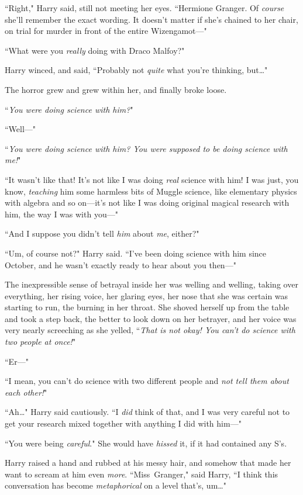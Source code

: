 ``Right," Harry said, still not meeting her eyes. ``Hermione Granger. Of \emph{course} she'll remember the exact wording. It doesn't matter if she's chained to her chair, on trial for murder in front of the entire Wizengamot—"

``What were you \emph{really} doing with Draco Malfoy?"

Harry winced, and said, ``Probably not \emph{quite} what you're thinking, but{\ldots}"

The horror grew and grew within her, and finally broke loose.

``\emph{You were doing \emph{science} with him?}"

``Well—"

``\emph{You were doing \emph{science} with him? You were supposed to be doing science with \emph{me}!}"

``It wasn't like that! It's not like I was doing \emph{real} science with him! I was just, you know, \emph{teaching} him some harmless bits of Muggle science, like elementary physics with algebra and so on—it's not like I was doing original magical research with him, the way I was with you—"

``And I suppose you didn't tell \emph{him} about \emph{me}, either?"

``Um, of course not?" Harry said. ``I've been doing science with him since October, and he wasn't exactly ready to hear about you then—"

The inexpressible sense of betrayal inside her was welling and welling, taking over everything, her rising voice, her glaring eyes, her nose that she was certain was starting to run, the burning in her throat. She shoved herself up from the table and took a step back, the better to look down on her betrayer, and her voice was very nearly screeching as she yelled, ``\emph{That is not okay! You can't do science with two people at once!}"

``Er—"

``I mean, you can't do science with two different people and \emph{not tell them about each other!}"

``Ah{\ldots}" Harry said cautiously. ``I \emph{did} think of that, and I was very careful not to get your research mixed together with anything I did with him—"

``You were being \emph{careful}." She would have \emph{hissed} it, if it had contained any S's.

Harry raised a hand and rubbed at his messy hair, and somehow that made her want to scream at him even \emph{more}. ``Miss~Granger," said Harry, ``I think this conversation has become \emph{metaphorical} on a level that's, um{\ldots}"

